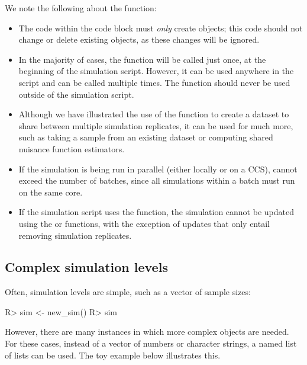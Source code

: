 We note the following about the  function:

\begin{itemize}
  \item The code within the  code block must \textit{only} create objects; this code should not change or delete existing objects, as these changes will be ignored.
  \item In the majority of cases, the  function will be called just once, at the beginning of the simulation script. However, it can be used anywhere in the script and can be called multiple times. The  function should never be used outside of the simulation script.
  \item Although we have illustrated the use of the  function to create a dataset to share between multiple simulation replicates, it can be used for much more, such as taking a sample from an existing dataset or computing shared nuisance function estimators.
  \item If the simulation is being run in parallel (either locally or on a CCS),  cannot exceed the number of batches, since all simulations within a batch must run on the same core.
  \item If the simulation script uses the  function, the simulation cannot be updated using the  or  functions, with the exception of updates that only entail removing simulation replicates.
\end{itemize}

\subsection{Complex simulation levels}

Often, simulation levels are simple, such as a vector of sample sizes:

\begin{example}
R> sim <- new_sim()
R> sim %
\end{example}

However, there are many instances in which more complex objects are needed. For these cases, instead of a vector of numbers or character strings, a named list of lists can be used. The toy example below illustrates this.


